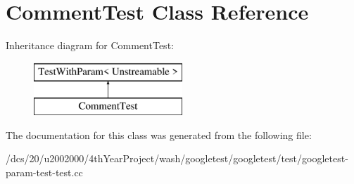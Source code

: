 \hypertarget{classCommentTest}{}\section{Comment\+Test Class Reference}
\label{classCommentTest}
Inheritance diagram for Comment\+Test\+:\begin{figure}[H]
\begin{center}
\leavevmode
\includegraphics[height=2.000000cm]{classCommentTest}
\end{center}
\end{figure}


The documentation for this class was generated from the following file\+:\begin{DoxyCompactItemize}
\item 
/dcs/20/u2002000/4th\+Year\+Project/wash/googletest/googletest/test/googletest-\/param-\/test-\/test.\+cc\end{DoxyCompactItemize}
